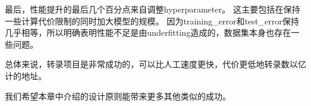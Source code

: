 
最后，性能提升的最后几个百分点来自调整\gls{hyperparameter}。
这主要包括在保持一些计算代价限制的同时加大模型的规模。
因为\gls{training_error}和\gls{test_error}保持几乎相等，所以明确表明性能不足是由\gls{underfitting}造成的，数据集本身也存在一些问题。


总体来说，转录项目是非常成功的，可以比人工速度更快，代价更低地转录数以亿计的地址。

我们希望本章中介绍的设计原则能带来更多其他类似的成功。

